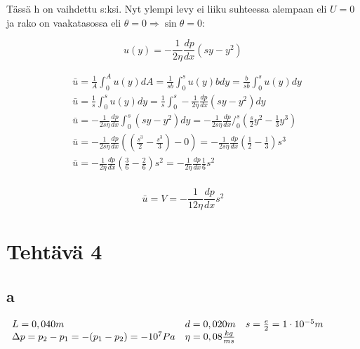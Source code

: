 \documentclass[12pt,a4paper,finnish]{article}
\begin{document}
Tässä h on vaihdettu s:ksi. Nyt ylempi levy ei liiku suhteessa alempaan eli $U = 0$ ja rako on 
vaakatasossa eli $\theta = 0 \Rightarrow \sin\theta = 0$:

\begin{equation}
 u(y) = - \frac{1}{2\eta}\frac{dp}{dx}(sy - y^2)
\end{equation}

\begin{align}
  &\bar{u} = \frac{1}{A}\int_0^A u(y)dA = \frac{1}{sb}\int_0^s u(y)bdy = \frac{b}{sb}\int_0^s u(y)dy\\ 
  &\bar{u} = \frac{1}{s}\int_0^s u(y)dy = \frac{1}{s}\int_0^s - \frac{1}{2\eta}\frac{dp}{dx}(sy - y^2)dy\\ 
  &\bar{u} = - \frac{1}{2s\eta}\frac{dp}{dx}\int_0^s (sy - y^2)dy = - \frac{1}{2s\eta}\frac{dp}{dx}\bigg/_0^s \left(\frac{s}{2}y^2 - \frac{1}{3}y^3\right)\\ 
  &\bar{u} = - \frac{1}{2s\eta}\frac{dp}{dx}\left( \left(\frac{s^3}{2} - \frac{s^3}{3}\right) - 0 \right) 
    = - \frac{1}{2s\eta}\frac{dp}{dx}\left(\frac{1}{2} - \frac{1}{3}\right)s^3\\
  &\bar{u} = - \frac{1}{2\eta}\frac{dp}{dx}\left(\frac{3}{6} - \frac{2}{6}\right)s^2 = -\frac{1}{2\eta}\frac{dp}{dx}\frac{1}{6}s^2\\ 
\end{align}

\begin{framed}
 \begin{equation}
  \label{eq:u_avg}
  \bar{u} = V = -\frac{1}{12\eta}\frac{dp}{dx}s^2
 \end{equation}
\end{framed}

\section{Tehtävä 4}

\subsection{a}

\begin{math}
 \begin{array}{l l l}
  L = 0,040m & d = 0,020m & s = \frac{e}{2} = 1\cdot10^{-5}m\\
  \Delta p = p_2 - p_1 = -(p_1 - p_2) = -10^7Pa & \eta = 0,08\frac{kg}{ms} &
 \end{array}
\end{math}
\end{document}
